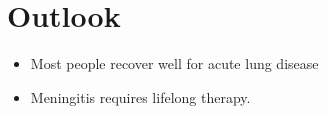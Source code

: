 \section{Outlook}
\begin{itemize}[noitemsep]
  \item Most people recover well for acute lung disease
  \item Meningitis requires lifelong therapy.
\end{itemize}
